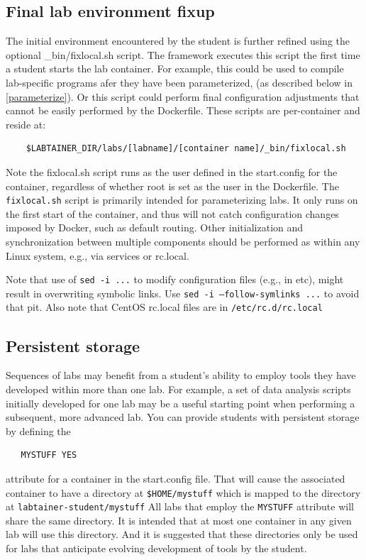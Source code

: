 \documentclass[12pt]{article}
\begin{document}
\subsection{Final lab environment fixup}
The initial environment encountered by the student is further refined using
the optional \_bin/fixlocal.sh script.  The framework executes
this script the first time a student starts the lab container.  For example,
this could be used to compile lab-specific programs afer they have been parameterized,
(as described below in \ref{parameterize}).  Or this script could perform final configuration adjustments
that cannot be easily performed by the Dockerfile.  These scripts are per-container
and reside at:
\begin{verbatim}
    $LABTAINER_DIR/labs/[labname]/[container name]/_bin/fixlocal.sh
\end{verbatim}
\noindent Note the fixlocal.sh script runs as the user defined in the start.config for the container, 
regardless of whether root is set as the user in the Dockerfile.  The {\tt fixlocal.sh} script is primarily
intended for parameterizing labs.  It only runs on the first start of the container, and thus will not catch configuration changes 
imposed by Docker, such as default routing. Other initialization and synchronization between multiple components 
should be performed as within any Linux system, e.g., via services or rc.local.

Note that use of {\tt sed -i ...} to modify configuration files (e.g., in etc), might result in overwriting symbolic links.
Use {\tt sed -i --follow-symlinks ...} to avoid that pit.  Also note that CentOS rc.local files are in {\tt /etc/rc.d/rc.local}

\subsection{Persistent storage}
\label{persistent}
Sequences of labs may benefit from a student's ability to employ tools they have developed within more than one lab.
For example, a set of data analysis scripts initially developed for one lab may be a useful starting point when
performing a subsequent, more advanced lab.  You can provide students with persistent storage by defining the
\begin{verbatim}
   MYSTUFF YES
\end{verbatim}
\noindent attribute for a container in the start.config file.  That will cause the associated container to have
a directory at {\tt \$HOME/mystuff} which is mapped to the directory at {\tt labtainer-student/mystuff}
All labs that employ the {\tt MYSTUFF} attribute will share the same directory.  It is intended that at most one
container in any given lab will use this directory.  And it is suggested that these directories only be used for
labs that anticipate evolving development of tools by the student.  
\end{document}
